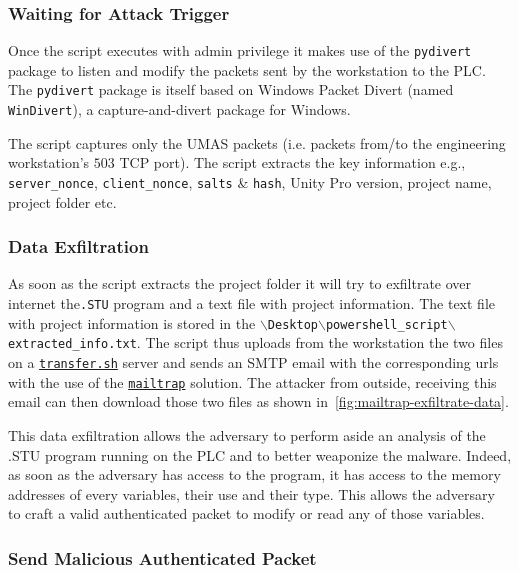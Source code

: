 \subsubsection{Waiting for Attack Trigger}

Once the script executes with admin privilege it makes use of the \texttt{pydivert} package to listen and modify the packets sent by the workstation to the PLC. The \texttt{pydivert} package is itself based on Windows Packet Divert (named \texttt{WinDivert}), a capture-and-divert package for Windows. 

The script captures only the UMAS packets (i.e. packets from/to the engineering workstation's $503$ TCP port). The script extracts the key information e.g., \texttt{server\_nonce}, \texttt{client\_nonce}, \texttt{salts} \& \texttt{hash}, Unity Pro version, project name, project folder etc. 

\subsubsection{Data Exfiltration}

As soon as the script extracts the project folder it will try to exfiltrate over internet the\texttt{.STU} program and a text file with project information. The text file with project information is stored in the \texttt{$\backslash$Desktop$\backslash$powershell\_script$\backslash$extracted\_info.txt}. The script thus uploads from the workstation the two files on a \href{transfer.sh}{\texttt{transfer.sh}} server and sends an SMTP email with the corresponding urls with the use of the \href{https://mailtrap.io/}{\texttt{mailtrap}} solution. The attacker from outside, receiving this email can then download those two files as shown in~\autoref{fig:mailtrap-exfiltrate-data}.

This data exfiltration allows the adversary to perform aside an analysis of the .STU program running on the PLC and to better weaponize the malware. Indeed, as soon as the adversary has access to the program, it has access to the memory addresses of every variables, their use and their type. This allows the adversary to craft a valid authenticated packet to modify or read any of those variables. 

\subsubsection{Send Malicious Authenticated Packet}

\label{subsec:malicious-sent-packets}

